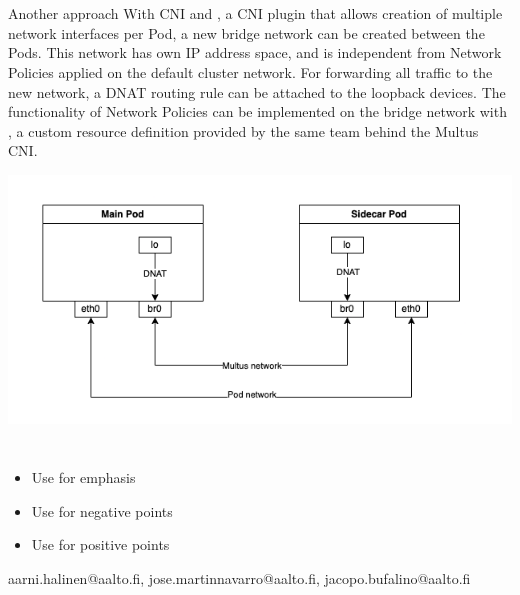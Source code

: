\documentclass[portrait,a1,final]{a0poster}
\begin{document}
\begin{minipage}{\posterwidth}
\begin{minipage}[t]{\doublecolumnwidth}
    \section*{}

    Another approach With  CNI and , a CNI plugin that allows creation of multiple network interfaces per Pod, a new bridge network can be created between the Pods. This network has own IP address space, and is independent from Network Policies applied on the default cluster network. For forwarding all  traffic to the new network, a DNAT routing rule can be attached to the loopback devices. The functionality of Network Policies can be implemented on the bridge network with , a custom resource definition provided by the same team behind the Multus CNI.

    \includegraphics[width=\linewidth]{figures/multus.png}
  \end{minipage}
\end{minipage}

\section*{}
\begin{itemize}
        \item Use  for emphasis
        \item Use  for negative points
        \item Use  for positive points
\end{itemize}

\makefooter
  {
    aarni.halinen@aalto.fi,
    jose.martinnavarro@aalto.fi,
    jacopo.bufalino@aalto.fi
  }
\end{document}
